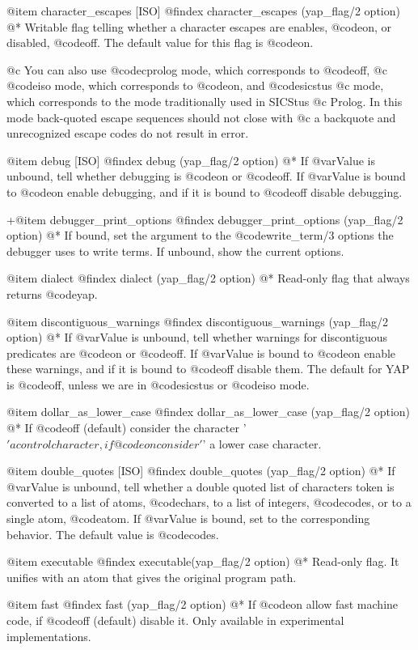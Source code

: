 {{{{{{{@item character_escapes [ISO]
@findex  character_escapes (yap_flag/2 option)
@* Writable flag telling whether a character escapes are enables,
@code{on}, or disabled, @code{off}. The default value for this flag is
@code{on}.

@c You can also use @code{cprolog} mode, which corresponds to @code{off},
@c @code{iso} mode, which corresponds to @code{on}, and @code{sicstus}
@c mode, which corresponds to the mode traditionally used in SICStus
@c Prolog. In this mode back-quoted escape sequences should not close with
@c a backquote and unrecognized escape codes do not result in error.

@item debug [ISO]
@findex debug (yap_flag/2 option)
@*
If @var{Value} is unbound, tell whether debugging is @code{on} or
@code{off}. If @var{Value} is bound to @code{on} enable debugging, and if
it is bound to @code{off} disable debugging.

+@item debugger_print_options
@findex debugger_print_options (yap_flag/2 option)
@* 
If bound, set the argument to the @code{write_term/3} options the
debugger uses to write terms. If unbound, show the current options.

@item dialect
@findex dialect (yap_flag/2 option)
@*
Read-only flag that always returns @code{yap}.

@item discontiguous_warnings
@findex discontiguous_warnings (yap_flag/2 option)
@*
If @var{Value} is unbound, tell whether warnings for discontiguous
predicates are @code{on} or
@code{off}. If @var{Value} is bound to @code{on} enable these warnings,
and if it is bound to @code{off} disable them. The default for YAP is
@code{off}, unless we are in @code{sicstus} or @code{iso} mode.

@item  dollar_as_lower_case
@findex dollar_as_lower_case (yap_flag/2 option)
@*
If @code{off} (default)  consider the character '$' a control character, if
@code{on} consider '$' a lower case character.

@item double_quotes [ISO]
@findex double_quotes (yap_flag/2 option)
@*
If @var{Value} is unbound, tell whether a double quoted list of characters
token is converted to a list of atoms, @code{chars}, to a list of integers,
@code{codes}, or to a single atom, @code{atom}. If @var{Value} is bound, set to
the corresponding behavior. The default value is @code{codes}.

@item executable
@findex executable(yap_flag/2 option)
@* Read-only flag. It unifies with an atom that gives the
original program path.

@item  fast
@findex fast (yap_flag/2 option)
@*
If @code{on} allow fast machine code, if @code{off} (default) disable it. Only
available in experimental implementations.

}}}}}}}
